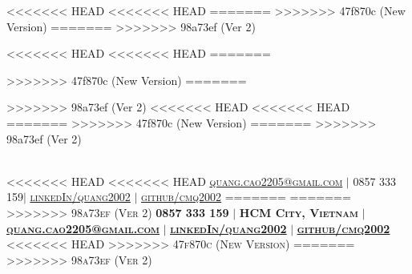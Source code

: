 \documentclass[]{resume-openfont}
\begin{document}
\newcommand{\yourName}{Cao Minh Quang}
\newcommand{\yourWebsite}{website.com}
\newcommand{\yourWebsiteLink}{https://website.com}
\newcommand{\yourEmail}{quang.cao2205@gmail.com}
<<<<<<< HEAD
<<<<<<< HEAD
\newcommand{\yourPhone}{0857 333 159}
=======
\newcommand{\yourPhone}{+84 857 333 159}
\newcommand{\yourLocation}{HCM City, Vietnam}
>>>>>>> 47f870c (New Version)
=======
\newcommand{\yourPhone}{+84 857 333 159}
\newcommand{\yourLocation}{HCM City, Vietnam}
>>>>>>> 98a73ef (Ver 2)
\newcommand{\githubUserName}{cmq2002}
\newcommand{\linkedInUserName}{quang2002}

<<<<<<< HEAD
<<<<<<< HEAD
=======

>>>>>>> 47f870c (New Version)
=======

>>>>>>> 98a73ef (Ver 2)
<<<<<<< HEAD
<<<<<<< HEAD
=======
>>>>>>> 47f870c (New Version)
=======
>>>>>>> 98a73ef (Ver 2)

\begin{center}
    \Huge \scshape \latoRegular{\yourName} \\ \vspace{1pt}
<<<<<<< HEAD
<<<<<<< HEAD
    \small \href{mailto:\yourEmail}{\underline{\yourEmail}}  $|$  \yourPhone $|$ 
    \href{https://www.linkedin.com/in/\linkedInUserName}{\underline{linkedIn/\linkedInUserName}} $|$
    \href{https://github.com/\githubUserName}{\underline{github/\githubUserName}} 
=======
=======
>>>>>>> 98a73ef (Ver 2)
    \small \textbf{\yourPhone} $|$ \textbf{\yourLocation} $|$
    \href{mailto:\yourEmail}{\underline{\textbf{\yourEmail}}} $|$
    \href{https://www.linkedin.com/in/\linkedInUserName}{\underline{\textbf{linkedIn/\linkedInUserName}}} $|$
    \href{https://github.com/\githubUserName}{\underline{\textbf{github/\githubUserName}}} 
<<<<<<< HEAD
>>>>>>> 47f870c (New Version)
=======
>>>>>>> 98a73ef (Ver 2)
\end{center}
\end{document}
